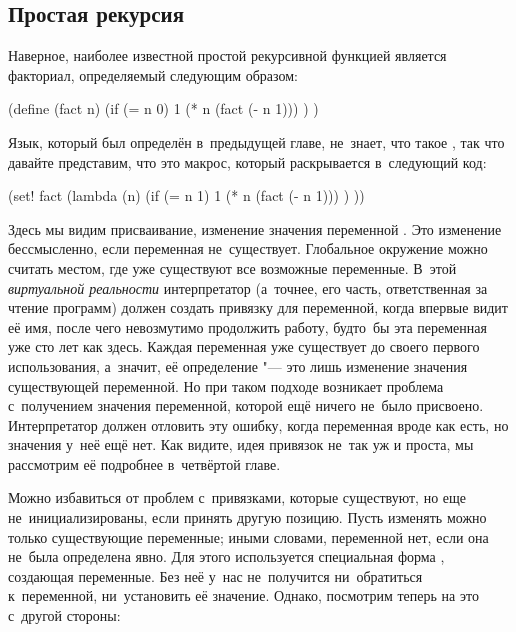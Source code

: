 \subsection{Простая рекурсия}\label{lisp1-2-omega/recusion/ssect:simple}

Наверное, наиболее известной простой рекурсивной функцией является факториал,
определяемый следующим образом:

\begin{code:lisp}
(define (fact n)
  (if (= n 0) 1
      (* n (fact (- n 1))) ) )
\end{code:lisp}

Язык, который был определён в~предыдущей главе, не~знает, что такое ,
так что давайте представим, что это макрос, который раскрывается в~следующий
код:

\begin{code:lisp}
(set! fact (lambda (n)
             (if (= n 1) 1
                 (* n (fact (- n 1))) ) ))
\end{code:lisp}

Здесь мы видим присваивание, изменение значения переменной . Это
изменение бессмысленно, если переменная  не~существует. Глобальное
окружение можно считать местом, где уже существуют все возможные переменные.
В~этой \emph{виртуальной реальности} интерпретатор (а~точнее, его часть,
ответственная за чтение программ) должен создать привязку для переменной, когда
впервые видит её имя, после чего невозмутимо продолжить работу, будто~бы эта
переменная уже сто лет как здесь. Каждая переменная уже существует до своего
первого использования, а~значит, её определение "--- это лишь изменение значения
существующей переменной. Но при таком подходе возникает проблема с~получением
значения переменной, которой ещё ничего не~было присвоено. Интерпретатор должен
отловить эту ошибку, когда переменная вроде как есть, но значения у~неё ещё нет.
Как видите, идея привязок не~так уж и проста, мы рассмотрим её подробнее
в~четвёртой главе. 

Можно избавиться от проблем с~привязками, которые существуют, но еще
не~инициализированы, если принять другую позицию. Пусть изменять можно только
существующие переменные; иными словами, переменной нет, если она не~была
определена явно. Для этого используется специальная форма ,
создающая переменные. Без неё у~нас не~получится ни~обратиться к~переменной,
ни~установить её значение. Однако, посмотрим теперь на это с~другой стороны:


